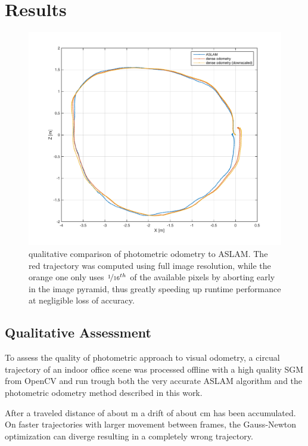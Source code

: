 \chapter{Results}
\label{sec:results}



\begin{figure}
    \centering
    \includegraphics[width=\textwidth]{images/traj_aslam_downscaled.pdf}
    \caption{qualitative comparison of photometric odometry to ASLAM. The red
    trajectory was computed using full image resolution, while the orange one
    only uses $\nicefrac{1}{16}^{th}$ of the available pixels by aborting early in
the image pyramid, thus greatly speeding up runtime performance at negligible
loss of accuracy.}
    \label{fig:trajectory}
\end{figure}

\section{Qualitative Assessment}
\label{sec:results_qualitative}

To assess the quality of photometric approach to visual odometry, a circual
trajectory of an indoor office scene was processed offline with a high quality
SGM from OpenCV and run trough both the very accurate ASLAM algorithm
\cite{leutenegger2013keyframe} and the photometric odometry method described in
this work.

After a traveled distance of about \unit[12]{m} a drift of about \unit[20]{cm}
has been accumulated. On faster trajectories with larger movement between
frames, the Gauss-Newton optimization can diverge resulting in a completely
wrong trajectory.

